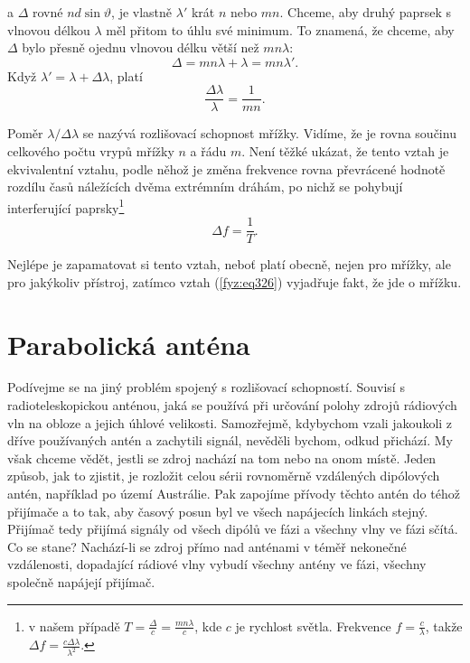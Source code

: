     a \(\Delta\) rovné \(nd\sin\vartheta\), je vlastně \(\lambda'\) krát \(n\) nebo \(mn\). Chceme, 
    aby druhý paprsek s vlnovou délkou \(\lambda\) měl přitom to úhlu své minimum. To znamená, že 
    chceme, aby \(\Delta\) bylo přesně ojednu vlnovou délku větší než \(mn\lambda\):
    \begin{equation*}
      \Delta = mn\lambda + \lambda = mn\lambda'.
    \end{equation*}
    Když \(\lambda' = \lambda + \Delta\lambda\), platí
    \begin{equation}\label{fyz:eq326}
      \frac{\Delta\lambda}{\lambda} = \frac{1}{mn}.
    \end{equation}
    
    Poměr \(\lambda/\Delta\lambda\) se nazývá rozlišovací schopnost mřížky. Vidíme, že je rovna 
    součinu celkového počtu vrypů mřížky \(n\) a řádu \(m\). Není těžké ukázat, že tento vztah je 
    ekvivalentní vztahu, podle něhož je změna frekvence rovna převrácené hodnotě rozdílu časů 
    náležících dvěma extrémním dráhám, po nichž se pohybují interferující paprsky\footnote{v našem 
    případě \(T=\frac{\Delta}{c} = \frac{mn\lambda}{c}\), kde \(c\) je rychlost světla. Frekvence 
    \(f = \frac{c}{\lambda}\), takže \(\Delta f = \frac{c\Delta\lambda}{\lambda^2}\).}
    \begin{equation*}
      \Delta f =\frac{1}{T}.
    \end{equation*}
    
    Nejlépe je zapamatovat si tento vztah, neboť platí obecně, nejen pro mřížky, ale pro jakýkoliv 
    přístroj, zatímco vztah (\ref{fyz:eq326}) vyjadřuje fakt, že jde o mřížku.
    
  \section{Parabolická anténa}\label{fyz:IchapXXXsecIV}
    Podívejme se na jiný problém spojený s rozlišovací schopností. Souvisí s radioteleskopickou 
    anténou, jaká se používá při určování polohy zdrojů rádiových vln na obloze a jejich úhlové 
    velikosti. Samozřejmě, kdybychom vzali jakoukoli z dříve používaných antén a zachytili signál, 
    nevěděli bychom, odkud přichází. My však chceme vědět, jestli se zdroj nachází na tom nebo na 
    onom místě. Jeden způsob, jak to zjistit, je rozložit celou sérii rovnoměrně vzdálených 
    dipólových antén, například po území Austrálie. Pak zapojíme přívody těchto antén do téhož 
    přijímače a to tak, aby časový posun byl ve všech napájecích linkách stejný. Přijímač tedy 
    přijímá signály od všech dipólů ve fázi a všechny vlny ve fázi sčítá. Co se stane? Nachází-li 
    se zdroj přímo nad anténami v téměř nekonečné vzdálenosti, dopadající rádiové vlny vybudí 
    všechny antény ve fázi, všechny společně napájejí přijímač. 
    
